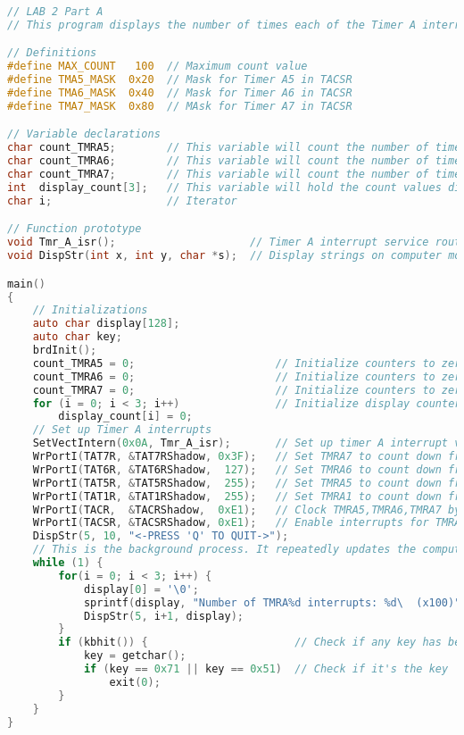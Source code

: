 \begin{lstlisting}[language=C]
// LAB 2 Part A 
// This program displays the number of times each of the Timer A interrupts have occured on the computer monitor

// Definitions
#define MAX_COUNT   100  // Maximum count value
#define TMA5_MASK  0x20  // Mask for Timer A5 in TACSR
#define TMA6_MASK  0x40  // Mask for Timer A6 in TACSR
#define TMA7_MASK  0x80  // MAsk for Timer A7 in TACSR

// Variable declarations
char count_TMRA5;        // This variable will count the number of times Timer A5 has triggered an interrupted
char count_TMRA6;        // This variable will count the number of times Timer A6 has triggered an interrupted
char count_TMRA7;        // This variable will count the number of times Timer A7 has triggered an interrupted
int  display_count[3];   // This variable will hold the count values divided by 100
char i;                  // Iterator

// Function prototype
void Tmr_A_isr();                     // Timer A interrupt service routine
void DispStr(int x, int y, char *s);  // Display strings on computer monitor

main()
{
    // Initializations
    auto char display[128];
    auto char key;
    brdInit();
    count_TMRA5 = 0;                      // Initialize counters to zero
    count_TMRA6 = 0;                      // Initialize counters to zero
    count_TMRA7 = 0;                      // Initialize counters to zero
    for (i = 0; i < 3; i++)               // Initialize display counters to zero
        display_count[i] = 0;
    // Set up Timer A interrupts
    SetVectIntern(0x0A, Tmr_A_isr);       // Set up timer A interrupt vector
    WrPortI(TAT7R, &TAT7RShadow, 0x3F);   // Set TMRA7 to count down from 63
    WrPortI(TAT6R, &TAT6RShadow,  127);   // Set TMRA6 to count down from 127
    WrPortI(TAT5R, &TAT5RShadow,  255);   // Set TMRA5 to count down from 255
    WrPortI(TAT1R, &TAT1RShadow,  255);   // Set TMRA1 to count down from 255
    WrPortI(TACR,  &TACRShadow,  0xE1);   // Clock TMRA5,TMRA6,TMRA7 by TMRA1. Clock TMRA4 by PCLK/2. Set Timer A to trigger priority 1 interrupts
    WrPortI(TACSR, &TACSRShadow, 0xE1);   // Enable interrupts for TMRA5,TMRA6,TMRA7 only. Enable main clock for Timer A
    DispStr(5, 10, "<-PRESS 'Q' TO QUIT->");
    // This is the background process. It repeatedly updates the computer monitor with the values in the display_count array
    while (1) {
        for(i = 0; i < 3; i++) {
            display[0] = '\0';
            sprintf(display, "Number of TMRA%d interrupts: %d\  (x100)", i+5, display_count[i]);
            DispStr(5, i+1, display);
        }
        if (kbhit()) {                       // Check if any key has been pressed
            key = getchar();
            if (key == 0x71 || key == 0x51)  // Check if it's the key 'q' or 'Q'
                exit(0);
        }
    }
}


\end{lstlisting}
